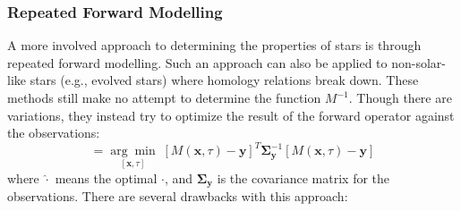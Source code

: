 



\subsubsection*{Repeated Forward Modelling} 
A more involved approach to determining the properties of stars is through repeated forward modelling. 
Such an approach can also be applied to non-solar-like stars (e.g., evolved stars) where homology relations break down. 
These methods still make no attempt to determine the function $M^{-1}$. 
Though there are variations, they instead try to optimize the result of the forward operator against the observations: 
\begin{equation}
    [\hat{\mathbf x}, \hat\tau]
    =
    \underset{[\mathbf x, \tau]}{\arg\min}\; \left[
        M(\mathbf x, \tau)
        -
        \mathbf y
    \right]^T
    \boldsymbol{\Sigma}_{\mathbf y}^{-1}
    \left[
        M(\mathbf x, \tau)
        -
        \mathbf y
    \right]
\end{equation}
where $\hat\cdot$ means the optimal $\cdot$, and $\boldsymbol\Sigma_{\mathbf y}$ is the covariance matrix for the observations. 
There are several drawbacks with this approach: 
